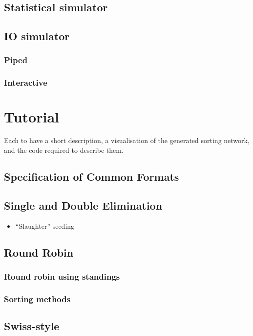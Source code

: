 \documentclass[a4,11pt,twoside,final]{article}
\begin{document}
\subsection{Statistical simulator}
\label{sec:org4071c1a}
\subsection{IO simulator}
\label{sec:orge794dba}
\subsubsection{Piped}
\label{sec:orgbb788bd}
\subsubsection{Interactive}
\label{sec:org742989f}


\section{Tutorial}
\label{sec:org1e38428}
Each to have a short description, a visualisation of the generated sorting
network, and the code required to describe them.
\subsection{Specification of Common Formats}
\label{sec:orgd114a4e}
\subsection{Single and Double Elimination}
\label{sec:org39c0a19}
\begin{itemize}
\item ``Slaughter'' seeding
\end{itemize}
\subsection{Round Robin}
\label{sec:org52c1627}
\subsubsection{Round robin using standings}
\label{sec:org6d97e5d}
\subsubsection{Sorting methods}
\label{sec:orgd2ce802}
\subsection{Swiss-style}
\label{sec:org4164c85}
\end{document}
